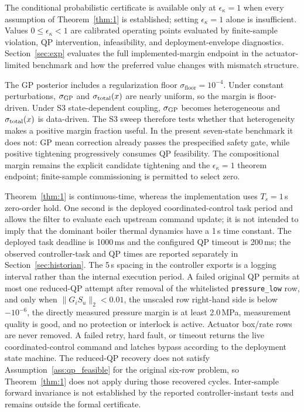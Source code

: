 The conditional probabilistic certificate is available only at $\epsilon_\kappa=1$ when every assumption of Theorem~\ref{thm:1} is established; setting $\epsilon_\kappa=1$ alone is insufficient. Values $0 \leq \epsilon_\kappa < 1$ are calibrated operating points evaluated by finite-sample violation, QP intervention, infeasibility, and deployment-envelope diagnostics. Section~\ref{sec:exp} evaluates the full implemented-margin endpoint in the actuator-limited benchmark and how the preferred value changes with mismatch structure.

The GP posterior includes a regularization floor $\sigma_{\mathrm{floor}}=10^{-4}$. Under constant perturbations, $\sigma_{\mathrm{GP}}$ and $\sigma_{\mathrm{total}}(x)$ are nearly uniform, so the margin is floor-driven. Under S3 state-dependent coupling, $\sigma_{\mathrm{GP}}$ becomes heterogeneous and $\sigma_{\mathrm{total}}(x)$ is data-driven. The S3 sweep therefore tests whether that heterogeneity makes a positive margin fraction useful. In the present seven-state benchmark it does not: GP mean correction already passes the prespecified safety gate, while positive tightening progressively consumes QP feasibility. The compositional margin remains the explicit candidate tightening and the $\epsilon_\kappa=1$ theorem endpoint; finite-sample commissioning is permitted to select zero.

Theorem~\ref{thm:1} is continuous-time, whereas the implementation uses $T_s = 1$\,s zero-order hold. One second is the deployed coordinated-control task period and allows the filter to evaluate each upstream command update; it is not intended to imply that the dominant boiler thermal dynamics have a 1\,s time constant. The deployed task deadline is 1000\,ms and the configured QP timeout is 200\,ms; the observed controller-task and QP times are reported separately in Section~\ref{sec:historian}. The 5\,s spacing in the controller exports is a logging interval rather than the internal execution period. A failed original QP permits at most one reduced-QP attempt after removal of the whitelisted \texttt{pressure\_low} row, and only when $\|G_iS_u\|_2<0.01$, the unscaled row right-hand side is below $-10^{-6}$, the directly measured pressure margin is at least 2.0\,MPa, measurement quality is good, and no protection or interlock is active. Actuator box/rate rows are never removed. A failed retry, hard fault, or timeout returns the live coordinated-control command and latches bypass according to the deployment state machine. The reduced-QP recovery does not satisfy Assumption~\ref{ass:qp_feasible} for the original six-row problem, so Theorem~\ref{thm:1} does not apply during those recovered cycles. Inter-sample forward invariance is not established by the reported controller-instant tests and remains outside the formal certificate.

